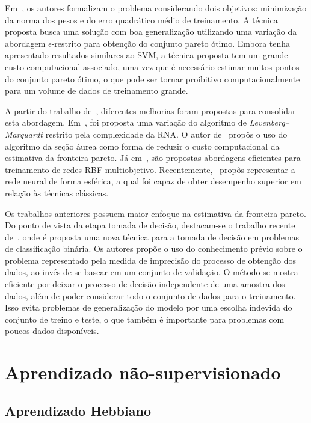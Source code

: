 \documentclass[conference]{IEEEtran}
\begin{document}
	Em~\cite{de2000improving}, os autores formalizam o problema considerando dois objetivos: minimização da norma dos pesos e do erro quadrático médio de treinamento. A técnica proposta busca uma solução com boa generalização utilizando uma variação da abordagem $\epsilon$-restrito para obtenção do conjunto pareto ótimo. Embora tenha apresentado resultados similares ao SVM, a técnica proposta tem um grande custo computacional associado, uma vez que é necessário estimar muitos pontos do conjunto pareto ótimo, o que pode ser tornar proibitivo computacionalmente para um volume de dados de treinamento grande.
	
	A partir do trabalho de~\cite{de2000improving}, diferentes melhorias foram propostas para consolidar esta abordagem. Em~\cite{costa2007improving}, foi proposta uma variação do algoritmo de \textit{Levenberg–Marquardt} restrito pela complexidade da RNA. O autor de~\cite{teixeira2007usage} propôs o uso do algoritmo da seção áurea como forma de reduzir o custo computacional da estimativa da fronteira pareto. Já em~\cite{kokshenev2010efficient, moreira2010lmi}, são propostas abordagens eficientes para treinamento de redes RBF multiobjetivo. Recentemente,~\cite{rocha2015training} propôs representar a rede neural de forma esférica, a qual foi capaz de obter desempenho superior em relação às técnicas clássicas.
	
	Os trabalhos anteriores possuem maior enfoque na estimativa da fronteira pareto. Do ponto de vista da etapa tomada de decisão, destacam-se o trabalho recente de~\cite{de2017multi}, onde é proposta uma nova técnica para a tomada de decisão em problemas de classificação binária. Os autores propõe o uso do conhecimento prévio sobre o problema representado pela medida de imprecisão do processo de obtenção dos dados, ao invés de se basear em um conjunto de validação. O método se mostra eficiente por deixar o processo de decisão independente de uma amostra dos dados, além de poder considerar todo o conjunto de dados para o treinamento. Isso evita problemas de generalização do modelo por uma escolha indevida do conjunto de treino e teste, o que também é importante para problemas com poucos dados disponíveis.
	
	\section{Aprendizado não-supervisionado}
	
	\subsection{Aprendizado Hebbiano}
	
\end{document}
